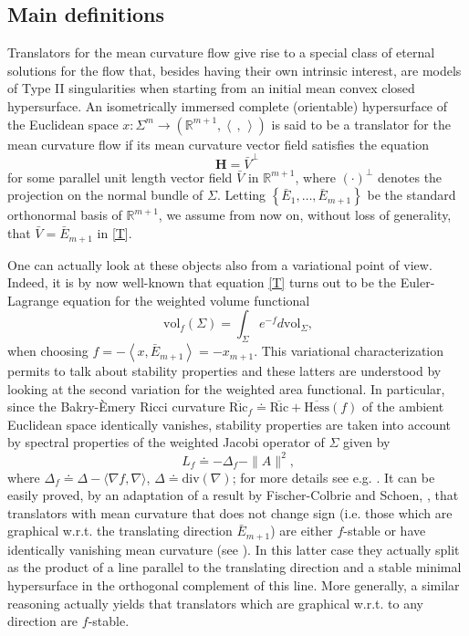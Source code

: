 \documentclass[11pt, leqno]{amsart}
\def\<{\left\langle}
\def\>{\right\rangle}
\def\<{\left\langle}
\def\>{\right\rangle}
\begin{document}
\subsection{Main definitions} Translators for the mean curvature flow give rise to a special class of eternal solutions for the flow that, besides having their own intrinsic interest, are models of Type II singularities when starting from an initial mean convex closed hypersurface. An isometrically immersed complete (orientable) hypersurface of the Euclidean space $x:\Sigma^m\to(\mathbb{R}^{m+1}, \<\,,\,\>)$ is said to be a translator for the mean curvature flow if its mean curvature vector field satisfies the equation
\begin{equation}\label{T}
\mathbf{H}=\bar{V}^{\bot}
\end{equation}
for some parallel unit length vector field $\bar{V}$ in $\mathbb{R}^{m+1}$, where $(\cdot)^{\bot}$ denotes the projection on the normal bundle of $\Sigma$.  Letting $\left\{\bar{E}_{1},\ldots,\bar{E}_{m+1}\right\}$ be the standard orthonormal basis of $\mathbb{R}^{m+1}$, we assume from now on, without loss of generality, that $\bar{V}=\bar{E}_{m+1}$ in \eqref{T}. 

One can actually look at these objects also from a variational point of view. Indeed, it is by now well-known that equation \eqref{T} turns out to be the Euler-Lagrange equation for the weighted volume functional 
\[
\ \mathrm{vol}_{f}(\Sigma)=\int_{\Sigma}e^{-f}d\mathrm{vol}_{\Sigma},
\]
when choosing $f=-\<x,\bar{E}_{m+1}\>=-x_{m+1}$. This variational characterization permits to talk about stability properties and these latters are understood by looking at the second variation for the weighted area functional. In particular, since the Bakry-\`Emery Ricci curvature $\overline{\mathrm{Ric}}_{f}\doteq \overline{\mathrm{Ric}}+\overline{\mathrm{Hess}}(f)$ of the ambient Euclidean space identically vanishes, stability properties are taken into account by spectral properties of the weighted Jacobi operator of $\Sigma$ given by
\[
\ L_{f}\doteq -\Delta_{f}-\|A\|^{2},
\]
where $\Delta_{f}\doteq \Delta-\langle\nabla f, \nabla\rangle$, $\Delta\doteq\mathrm{div}(\nabla)$; for more details see e.g. \cite{IR_fMin}. It can be easily proved, by an adaptation of a result by Fischer-Colbrie and Schoen, \cite{FCS}, that translators with mean curvature that does not change sign (i.e. those which are graphical w.r.t. the translating direction $\bar{E}_{m+1}$) are either $f$-stable or have identically vanishing mean curvature (see \cite{ImperaRimoldi_Transl}). In this latter case they actually split as the product of a line parallel to the translating direction and a stable minimal hypersurface in the orthogonal complement of this line. More generally, a similar reasoning actually yields that translators which are graphical w.r.t. to any direction are $f$-stable. 
\end{document}
